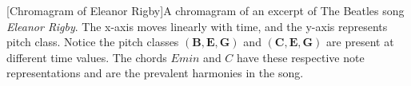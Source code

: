 [Chromagram of Eleanor Rigby]A chromagram of an excerpt of The Beatles song \textit{Eleanor Rigby}. The x-axis moves linearly with time, and the y-axis represents pitch class. Notice the pitch classes $(\textbf{B}, \textbf{E}, \textbf{G})$ and $(\textbf{C}, \textbf{E}, \textbf{G})$ are present at different time values. The chords $Emin$ and $C$ have these respective note representations and are the prevalent harmonies in the song.